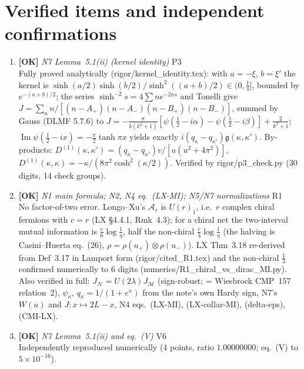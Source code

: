 \documentclass[11pt]{article}
\begin{document}
\section{Verified items and independent confirmations}
\begin{enumerate}[leftmargin=1.6em,itemsep=6pt]
\item \textbf{[OK]} \emph{N7 Lemma~5.1(ii) (kernel identity)} \hfill\textsc{P3}\\ Fully proved analytically (rigor/kernel\_identity.tex): with \(a=-\xi\), \(b=\xi'\) the kernel is \(\sinh(a/2)\sinh(b/2)/\sinh^2((a+b)/2)\in(0,\tfrac14]\), bounded by \(e^{-(a+b)/2}\); the series \(\sinh^{-2}s=4\sum n e^{-2ns}\) and Tonelli give \(J=\sum_n n/[(n-A_+)(n-A_-)(n-B_+)(n-B_-)]\), summed by Gauss (DLMF 5.7.6) to \(J=-\frac{\sigma}{k(k^2+1)}[\psi(\tfrac12-i\alpha)-\psi(\tfrac12-i\beta)]+\frac{2}{k^2+1}\); \(\operatorname{Im}\psi(\tfrac12-ix)=-\frac\pi2\tanh\pi x\) yields exactly \(i(q_\kappa-q_{\kappa'})\mathfrak g(\kappa,\kappa')\). By-products: \(D^{(1)}(\kappa,\kappa')=(q_\kappa-q_{\kappa'})v/[u(u^2+4\pi^2)]\), \(D^{(1)}(\kappa,\kappa)=-\kappa/(8\pi^2\cosh^2(\kappa/2))\). Verified by rigor/p3\_check.py (30 digits, 14 check groups).
\item \textbf{[OK]} \emph{N1 main formula; N2, N4 eq.\ (LX-MI); N5/N7 normalizations} \hfill\textsc{R1}\\ No factor-of-two error. Longo--Xu's \(\mathcal A_r\) is \(U(r)_1\), i.e.\ \(r\) complex chiral fermions with \(c=r\) (LX \S4.4.1, Rmk~4.3); for a chiral net the two-interval mutual information is \(\frac c6\log\frac1\eta\), half the non-chiral \(\frac c3\log\frac1\eta\) (the halving is Casini--Huerta eq.~(26), \(\rho=\rho(u_+)\otimes\rho(u_-)\)). LX Thm~3.18 re-derived from Def~3.17 in Lamport form (rigor/cited\_R1.tex) and the non-chiral \(\frac13\) confirmed numerically to 6 digits (numerics/R1\_chiral\_vs\_dirac\_MI.py). Also verified in full: \(J_{\mathcal N}=U(2\lambda)J_{\mathcal M}\) (sign-robust; = Wiesbrock CMP~157 relation~2), \(\psi_\kappa\), \(q_\kappa=1/(1+e^\kappa)\) from the note's own Hardy sign, N7's \(W(u)\) and \(J:x\mapsto2L-x\), N4 eqs.\ (LX-MI), (LX-collar-MI), (delta-eps), (CMI-LX).
\item \textbf{[OK]} \emph{N7 Lemma~5.1(ii) and eq.\ (V)} \hfill\textsc{V6}\\ Independently reproduced numerically (4 points, ratio \(1.00000000\); eq.\ (V) to \(5\times10^{-16}\)).

\end{enumerate}
\end{document}
